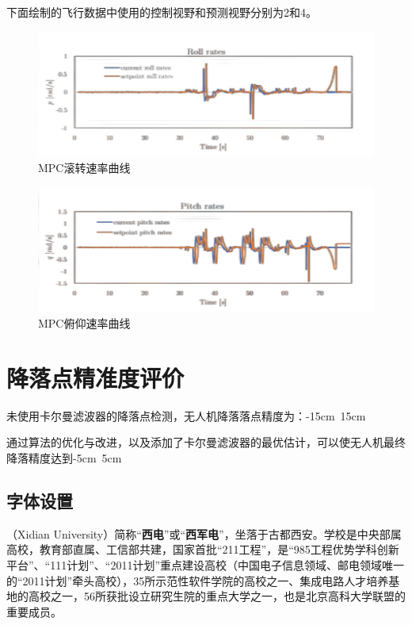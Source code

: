 下面绘制的飞行数据中使用的控制视野和预测视野分别为2和4。

\begin{figure}[ht]
  \centering
  \includegraphics[width=0.8\linewidth]{./Figure/MPC-Roll-Rates.png}
  \caption{MPC滚转速率曲线}\label{Fig:xd1}
\end{figure}

\begin{figure}[ht]
  \centering
  \includegraphics[width=0.8\linewidth]{./Figure/MPC-Pitch-Rates.png}
  \caption{MPC俯仰速率曲线}\label{Fig:xd1}
\end{figure}

\section{降落点精准度评价}

未使用卡尔曼滤波器的降落点检测，无人机降落落点精度为：-15cm~15cm

通过算法的优化与改进，以及添加了卡尔曼滤波器的最优估计，可以使无人机最终降落精度达到-5cm~5cm

\subsection{字体设置}
\textbf{}（Xidian University）简称“\textbf{西电}”或“\textbf{西军电}”，坐落于古都西安。学校是中央部属高校，教育部直属、工信部共建，国家首批“{\heiti 211工程}”，是“{\fangsong 985工程优势学科创新平台}”、“111计划”、“2011计划”重点建设高校{\youyuan （中国电子信息领域、邮电领域唯一的“2011计划”牵头高校）}，35所示范性软件学院的高校之一、集成电路人才培养基地的高校之一，56所获批设立研究生院的重点大学之一，也是{\lishu 北京高科大学联盟}的重要成员。 

